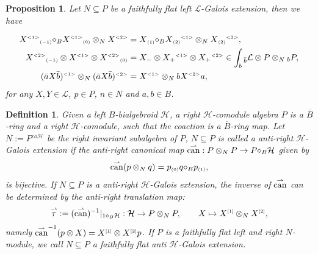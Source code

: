 \documentclass[a4paper,reqno]{amsart}
\numberwithin{equation}{section}
\theoremstyle{plain}
\newtheorem{prop}[thm]{Proposition}
\newtheorem{defi}[thm]{Definition}
\theoremstyle{remark}
\numberwithin{equation}{section}
\newcommand\inv{^{-1}}
\newcommand{\ot}{\otimes}
\newcommand{\cL}{\mathcal{L}}
\newcommand{\BB}{\overline{B}}
\newcommand{\rtau}{\overset\rightharpoonup\tau}
\newcommand{\rcan}{\overset\rightharpoonup\can}
\newcommand{\tuno}[1]{{#1}{}{}^{\scriptscriptstyle{<1>}}}
\newcommand{\tdue}[1]{{#1}{}{}^{\scriptscriptstyle{<2>}}}
\newcommand{\yi}[1]{{#1}{}{}^{\scriptscriptstyle{[1]}}}
\newcommand{\er}[1]{{#1}{}{}^{\scriptscriptstyle{[2]}}}
\newcommand{\z}{{}_{\scriptscriptstyle{(0)}}}
\renewcommand{\o}{{}_{\scriptscriptstyle{(1)}}}
\newcommand{\mo}{{}_{\scriptscriptstyle{(-1)}}}
\renewcommand{\t}{{}_{\scriptscriptstyle{(2)}}}
\newcommand{\di}{{\diamond_{B}}}
\newcommand{\CH}{\mathcal{H}}
\newcommand{\can}{{\rm can}}
\begin{document}
\begin{prop}
    Let $N\subseteq P$ be a faithfully flat left $\cL$-Galois extension, then we have

\begin{align}\label{equ. translation map 1}
  \tuno{X}\mo \di \tuno{X}\z \ot_{N} \tdue{X} &= X\o\di{}\tuno{X\t}\ot_{N}  \tdue{X\t},\\
\label{equ. translation map 2}
~~ \tdue{X}\mo\ot{}\tuno{X}  \ot \tdue{X}\z &= X_{-}\ot{}\tuno{X_{+}}\ot\tdue{X_{+}}\in \int_{b}{}_{\Bar{b}}\cL\ot P\ot_{N} {}_{b}P,\\
\label{equ. translation map 6}
\tuno{(\Bar{a}X  \Bar{b})}\ot_{N}\tdue{(\Bar{a}X  \Bar{b})}
&=\tuno{X}\ot_{N}b\tdue{X}a,
\end{align}
for any $X, Y\in \cL$, $p\in P$, $n\in N$ and $a, b\in B$. 
\end{prop}









\begin{defi}
Given a left $B$-bialgebroid $\CH$,  a right $\CH$-comodule algebra $P$ is a $\BB$-ring and a right $\CH$-comodule, such that the coaction is a $\BB$-ring map. Let $N:=P{}^{co\CH}$ be the right invariant subalgebra of $P$, $N\subseteq P$ is called a anti-right $\CH$-Galois extension if the anti-right canonical map $\rcan: P\ot_{N} P\to P\di{}\CH$ given by
    \[\rcan(p\ot_{N}q)=p\z q\di{}p\o ,\]
    is bijective. If $N\subseteq P$ is a
anti-right $\CH$-Galois extension, the inverse of $\rcan$ can be determined by the anti-right translation map:
    \begin{align}
       \rtau:=(\rcan)^{-1}|_{1\di{}\CH}:\CH\to P\ot_{N}P, \qquad X\mapsto \yi{X}\otimes_{N}\er{X},
    \end{align}
    namely $\rcan\inv(p\ot X)=\yi X\ot \er Xp$. If $P$ is a faithfully flat left and right $N$-module, we call $N\subseteq P$ a faithfully flat anti $\CH$-Galois extension.
\end{defi}
\end{document}
